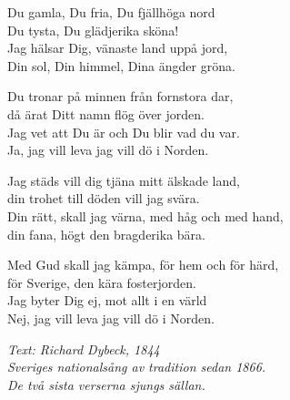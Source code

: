 \vspace{10pt}
Du gamla, Du fria, Du fjällhöga nord\\
Du tysta, Du glädjerika sköna!\\
Jag hälsar Dig, vänaste land uppå jord,\\
\revrpt Din sol, Din himmel, Dina ängder gröna.\rpt\par
\vspace{10pt}
Du tronar på minnen från fornstora dar,\\
då ärat Ditt namn flög över jorden.\\
Jag vet att Du är och Du blir vad du var.\\
\revrpt Ja, jag vill leva jag vill dö i Norden.\rpt\par
\vspace{10pt}
Jag städs vill dig tjäna mitt älskade land,\\
din trohet till döden vill jag svära.\\
Din rätt, skall jag värna, med håg och med hand,\\
\revrpt din fana, högt den bragderika bära.\rpt\par
\vspace{10pt}
Med Gud skall jag kämpa, för hem och för härd,\\
för Sverige, den kära fosterjorden.\\
Jag byter Dig ej, mot allt i en värld\\
\revrpt Nej, jag vill leva jag vill dö i Norden.\rpt\par
\vspace{10pt}
{\footnotesize\textit{Text: Richard Dybeck, 1844\\
Sveriges nationalsång av tradition sedan 1866.\\
De två sista verserna sjungs sällan.}}

